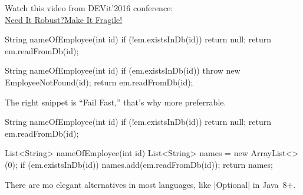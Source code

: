 \documentclass{article}
\begin{document}
\par
{}
\par
Watch this video from DEVit'2016 conference: \\
\href{https://www.youtube.com/watch?v=nCGBgI1MNwE}{Need It Robust?Make It Fragile!}
\plush{}


\begin{pptWide}{2}
{\small\begin{ffcode}
String nameOfEmployee(int id) {
  if (!em.existsInDb(id)) {
    return null;
  }
  return em.readFromDb(id);
}
\end{ffcode}
}
\par\columnbreak\par
{\small\begin{ffcode}
String nameOfEmployee(int id) {
  if (em.existsInDb(id)) {
    throw new EmployeeNotFound(id);
  }
  return em.readFromDb(id);
}
\end{ffcode}
}
\end{pptWide}
\par
The right snippet is ``Fail Fast,'' that's why more preferrable.
\plush{}

\begin{pptWide}{2}
{\small\begin{ffcode}
String nameOfEmployee(int id) {
  if (!em.existsInDb(id)) {
    return null;
  }
  return em.readFromDb(id);
}
\end{ffcode}
}
\par\columnbreak\par
{\small\begin{ffcode}
List<String> nameOfEmployee(int id) {
  List<String> names =
    new ArrayList<>(0);
  if (em.existsInDb(id)) {
    names.add(em.readFromDb(id));
  }
  return names;
}
\end{ffcode}
}
\end{pptWide}
\par
There are mo elegant alternatives in most languages, like |Optional| in Java~8+.
\plush{}
\end{document}
